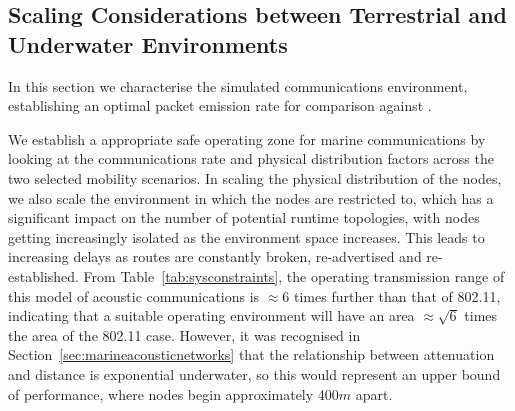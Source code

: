 \documentclass[conference]{IEEEtran}
\begin{document}
\subsection{Scaling Considerations between Terrestrial and Underwater Environments}

In this section we characterise the simulated communications environment, establishing an optimal packet emission rate for comparison against \cite{Guo11}.

We establish a appropriate safe operating zone for marine communications by looking at the communications rate and physical distribution factors across the two selected mobility scenarios.
In scaling the physical distribution of the nodes, we also scale the environment in which the nodes are restricted to, which has a significant impact on the number of potential runtime topologies, with nodes getting increasingly isolated as the environment space increases.
This leads to increasing delays as routes are constantly broken, re-advertised and re-established. 
From Table~\ref{tab:sysconstraints}, the operating transmission range of this model of acoustic communications is $\approx 6$ times further than that of 802.11, indicating that a suitable operating environment will have an area $\approx \sqrt{6}$ times the area of the 802.11 case.
However, it was recognised in Section~\ref{sec:marineacousticnetworks} that the relationship between attenuation and distance is exponential underwater, so this would represent an upper bound of performance, where nodes begin approximately 400$m$ apart. 
\end{document}
